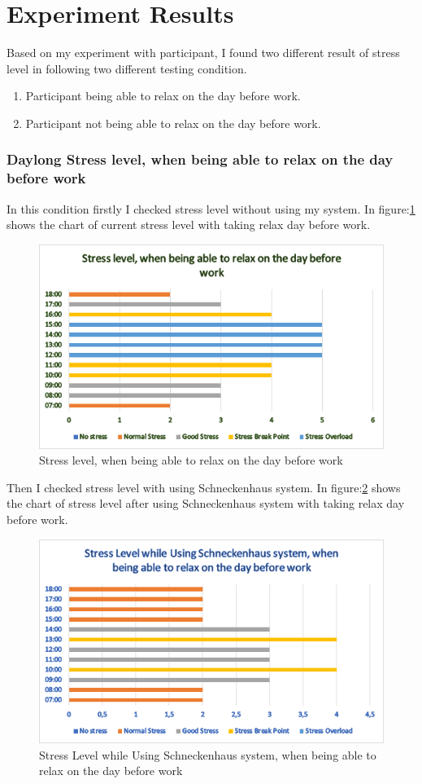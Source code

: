 \section{Experiment Results}
Based on my experiment with participant, I found two different result of stress level in following two different testing condition.
\begin{enumerate}
    \item Participant being able to relax on the day before work.
    \item Participant not being able to relax on the day before work.
\end{enumerate}
\subsubsection*{Daylong Stress level, when being able to relax on the day before work}
In this condition firstly I checked stress level without using my system. In figure:\ref{fig:st1} shows the chart of current stress level with taking relax day before work.
\begin{figure}[h] 
  \centering
  \includegraphics[width=.7\linewidth]{chap5/st1.png}
  \caption[Stress level, when being able to relax on the day before work]{Stress level, when being able to relax on the day before work}
  \label{fig:st1}
\end{figure}

Then I checked stress level with using Schneckenhaus system. In  figure:\ref{fig:st3} shows the chart of stress level after using Schneckenhaus system with taking relax day before work.
\begin{figure}[h] 
  \centering
  \includegraphics[width=.8\linewidth]{chap5/st3.png}
  \caption[Stress Level while Using Schneckenhaus system, when being able to relax on the day before work
]{Stress Level while Using Schneckenhaus system, when being able to relax on the day before work
}
  \label{fig:st3}
\end{figure}
